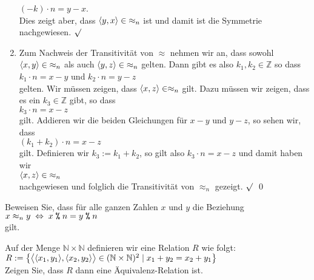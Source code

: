 \begin{enumerate}
      $(-k)\cdot n = y - x$.
      \\[0.2cm]
      Dies zeigt aber, dass $\pair(y,x) \in\; \approx_n$ ist und damit ist die Symmetrie
      nachgewiesen. $\surd$
\item Zum Nachweis der Transitivit\"{a}t von $\approx$ nehmen wir an, dass
      sowohl $\pair(x,y) \in\; \approx_n$ als auch $\pair(y,z) \in\; \approx_n$
      gelten.  Dann gibt es also $k_1,k_2 \in \mathbb{Z}$ so dass 
      \\[0.2cm]
      \hspace*{1.3cm}      
      $k_1 \cdot n = x - y$ \quad und \quad $k_2 \cdot n = y - z$ 
      \\[0.2cm]
      gelten.  Wir m\"{u}ssen zeigen, dass $\pair(x,z) \in \approx_n$ gilt.  Dazu m\"{u}ssen wir zeigen,
      dass es ein $k_3 \in \mathbb{Z}$ gibt, so dass
      \\[0.2cm]
      \hspace*{1.3cm}
      $k_3 \cdot n = x - z$
      \\[0.2cm]
      gilt.  Addieren wir die beiden Gleichungen f\"{u}r $x-y$ und $y-z$, so sehen wir, dass
      \\[0.2cm]
      \hspace*{1.3cm}      
      $(k_1 + k_2) \cdot n = x - z$
      \\[0.2cm]
      gilt.  Definieren wir  $k_3 := k_1 + k_2$, so gilt also $k_3\cdot n = x - z$ und damit haben wir
      \\[0.2cm]
      \hspace*{1.3cm}
      $\pair(x,z) \in\; \approx_n$ 
      \\[0.2cm]
      nachgewiesen und folglich die Transitivit\"{a}t von $\approx_n$ gezeigt. $\surd$ 
      \qed
\end{enumerate}

\exercise
Beweisen Sie, dass f\"{u}r alle ganzen Zahlen $x$ und $y$ die Beziehung
\\[0.2cm]
\hspace*{1.3cm}
 $x \approx_n y \;\Leftrightarrow\; x \;\texttt{\%}\; n = y \;\texttt{\%}\; n$
\\[0.2cm]
gilt.
\exend


\exercise
Auf der Menge $\mathbb{N} \times \mathbb{N}$ definieren wir eine Relation $R$ wie folgt:
\\[0.2cm]
\hspace*{1.3cm}
$R := \bigl\{ \bigl\langle \pair(x_1, y_1) ,\pair(x_2, y_2) \bigr\rangle \in  (\mathbb{N} \times \mathbb{N})^2 \mid x_1 + y_2 = x_2 + y_1 \bigr\}$
\\[0.2cm]
Zeigen Sie, dass $R$ dann eine \"{A}quivalenz-Relation ist.
\exend
\pagebreak

